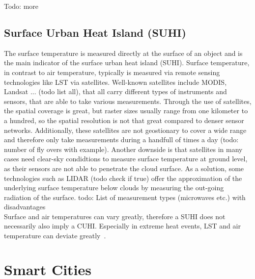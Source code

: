 Todo: more

\subsection{Surface Urban Heat Island (SUHI)}

The surface temperature is measured directly at the surface of an object and is the main indicator of the surface urban heat island (SUHI). Surface temperature, in contrast to air temperature, typically is measured via remote sensing technologies like LST via satellites. Well-known satellites include MODIS, Landsat ... (todo list all), that all carry different types of instruments and sensors, that are able to take various measurements. Through the use of satellites, the spatial coverage is great, but raster sizes usually range from one kilometer to a hundred, so the spatial resolution is not that great compared to denser sensor networks. Additionally, these satellites are not geostionary to cover a wide range and therefore only take measurements during a handfull of times a day (todo: number of fly overs with example). Another downside is that satellites in many cases need clear-sky condidtions to measure surface temperature at ground level, as their sensors are not able to penetrate the cloud surface. As a solution, some technologies such as LIDAR (todo check if true) offer the approximation of the underlying surface temperature below clouds by measuring the out-going radiation of the surface.
todo: List of measurement types (microwaves etc.) with disadvantages\\
Surface and air temperatures can vary greatly, therefore a SUHI does not necessarily also imply a CUHI. Especially in extreme heat events, LST and air temperature can deviate greatly~\cite{good2016situ}.

\section{Smart Cities}

